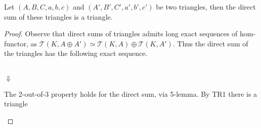     \begin{lemma}
        Let $(A,B,C,a,b,c)$ and $(A',B',C',a',b',c')$ be two triangles, then the direct sum of these triangles is a triangle.
    \end{lemma}

    \begin{proof}
        Observe that direct sums of triangles admits long exact sequences of hom-functor, as $\mathcal{T}(K,A\oplus A')\simeq\mathcal{T}(K,A)\oplus\mathcal{T}(K,A')$. Thus the direct sum of the triangles has the following exact sequence.
        \begin{center}
             \\
            $\Downarrow$ \\
        \end{center}
        The 2-out-of-3 property holds for the direct sum, via 5-lemma. By TR1 there is a triangle 
        \begin{center}
        \end{center}

\end{proof}
